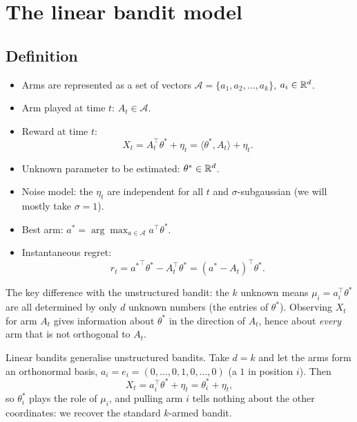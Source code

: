 \section{The linear bandit model}

\subsection{Definition}

\begin{definition}
\begin{itemize}
    \item Arms are represented as a set of vectors $\mathcal{A} = \{a_1, a_2, \dots, a_k\}$, $a_i \in \mathbb{R}^d$.
    \item Arm played at time $t$: $A_t \in \mathcal{A}$.
    \item Reward at time $t$:
    \[
    X_t = A_t^\top \theta^* + \eta_t = \langle \theta^*, A_t \rangle + \eta_t.
    \]
    \item Unknown parameter to be estimated: $\theta^* \in \mathbb{R}^d$.
    \item Noise model: the $\eta_t$ are independent for all $t$ and $\sigma$-subgaussian (we will mostly take $\sigma = 1$).
    \item Best arm: $a^* = \arg\max_{a\in\mathcal{A}} a^\top\theta^*$.
    \item Instantaneous regret:
    \[
    r_t = {a^*}^\top\theta^* - A_t^\top\theta^* = (a^* - A_t)^\top\theta^*.
    \]
\end{itemize}
\end{definition}

The key difference with the unstructured bandit: the $k$ unknown means $\mu_i = a_i^\top\theta^*$ are all determined by only $d$ unknown numbers (the entries of $\theta^*$). Observing $X_t$ for arm $A_t$ gives information about $\theta^*$ in the direction of $A_t$, hence about \emph{every} arm that is not orthogonal to $A_t$.

\begin{remark}
Linear bandits generalise unstructured bandits. Take $d = k$ and let the arms form an orthonormal basis, $a_i = e_i = (0, \dots, 0, 1, 0, \dots, 0)$ (a $1$ in position $i$). Then
\[
X_t = a_i^\top\theta^* + \eta_t = \theta_i^* + \eta_t,
\]
so $\theta_i^*$ plays the role of $\mu_i$, and pulling arm $i$ tells nothing about the other coordinates: we recover the standard $k$-armed bandit.
\end{remark}

